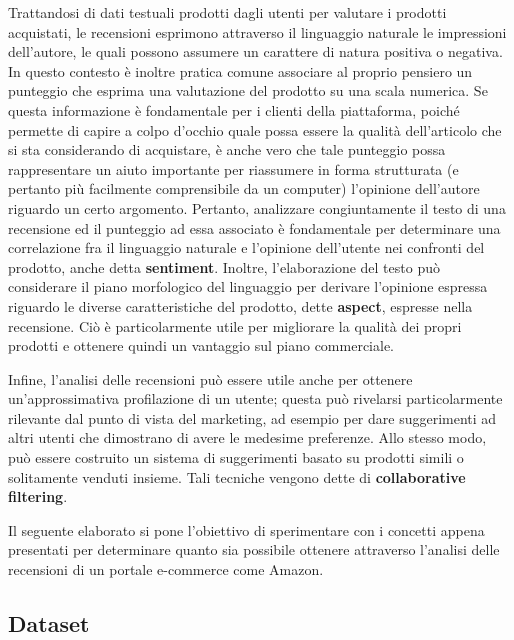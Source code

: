 \documentclass[hidelinks, 12pt]{article}
\begin{document}
Trattandosi di dati testuali prodotti dagli utenti per valutare i prodotti acquistati, le recensioni esprimono attraverso il linguaggio naturale le impressioni dell'autore, le quali possono assumere un carattere di natura positiva o negativa. In questo contesto è inoltre pratica comune associare al proprio pensiero un punteggio che esprima una valutazione del prodotto su una scala numerica. Se questa informazione è fondamentale per i clienti della piattaforma, poiché permette di capire a colpo d'occhio quale possa essere la qualità dell'articolo che si sta considerando di acquistare, è anche vero che tale punteggio possa rappresentare un aiuto importante per riassumere in forma strutturata (e pertanto più facilmente comprensibile da un computer) l'opinione dell'autore riguardo un certo argomento. Pertanto, analizzare congiuntamente il testo di una recensione ed il punteggio ad essa associato è fondamentale per determinare una correlazione fra il linguaggio naturale e l'opinione dell'utente nei confronti del prodotto, anche detta \textbf{sentiment}. Inoltre, l'elaborazione del testo può considerare il piano morfologico del linguaggio per derivare l'opinione espressa riguardo le diverse caratteristiche del prodotto, dette \textbf{aspect}, espresse nella recensione. Ciò è particolarmente utile per migliorare la qualità dei propri prodotti e ottenere quindi un vantaggio sul piano commerciale.

Infine, l'analisi delle recensioni può essere utile anche per ottenere un'approssimativa profilazione di un utente; questa può rivelarsi particolarmente rilevante dal punto di vista del marketing, ad esempio per dare suggerimenti ad altri utenti che dimostrano di avere le medesime preferenze. Allo stesso modo, può essere costruito un sistema di suggerimenti basato su prodotti simili o solitamente venduti insieme. Tali tecniche vengono dette di \textbf{collaborative filtering}.

Il seguente elaborato si pone l'obiettivo di sperimentare con i concetti appena presentati per determinare quanto sia possibile ottenere attraverso l'analisi delle recensioni di un portale e-commerce come Amazon.



\subsection{Dataset}
\label{sec:dataset}
\end{document}
